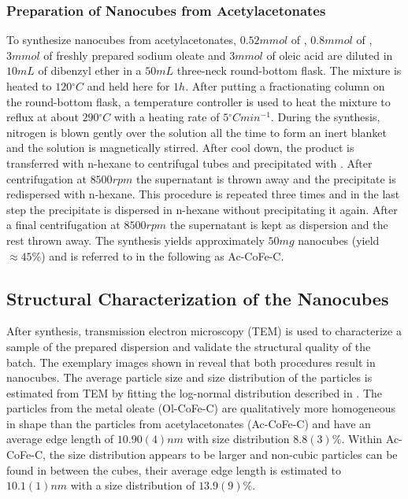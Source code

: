 \documentclass[\main/dresen_thesis.tex]{subfiles}
\begin{document}
    \subsubsection{Preparation of Nanocubes from Acetylacetonates}
      To synthesize nanocubes from acetylacetonates, $0.52 \unit{mmol}$ of , $0.8 \unit{mmol}$ of , $3 \unit{mmol}$ of freshly prepared sodium oleate and $3 \unit{mmol}$ of oleic acid are diluted in $10 \unit{mL}$ of dibenzyl ether in a $50 \unit{mL}$ three-neck round-bottom flask.
      The mixture is heated to $120 \unit{^\circ C}$ and held here for $1 \unit{h}$.
      After putting a fractionating column on the round-bottom flask, a temperature controller is used to heat the mixture to reflux at about $290 \unit{^\circ C}$ with a heating rate of $5 \unit{^\circ C min^{-1}}$.
      During the synthesis, nitrogen is blown gently over the solution all the time to form an inert blanket and the solution is magnetically stirred.
      After cool down, the product is transferred with n-hexane to centrifugal tubes and precipitated with .
      After centrifugation at $8500 \unit{rpm}$ the supernatant is thrown away and the precipitate is redispersed with n-hexane.
      This procedure is repeated three times and in the last step the precipitate is dispersed in n-hexane without precipitating it again.
      After a final centrifugation at $8500 \unit{rpm}$ the supernatant is kept as dispersion and the rest thrown away.
      The synthesis yields approximately $50 \unit{mg}$ nanocubes (yield $\approx 45 \%$) and is referred to in the following as Ac-CoFe-C.

  \subsection{Structural Characterization of the Nanocubes}
  \label{sec:monolayers:nanoparticle:structuralCharacterization}
    After synthesis, transmission electron microscopy (TEM) is used to characterize a sample of the prepared dispersion and validate the structural quality of the batch.
    The exemplary images shown in  reveal that both procedures result in nanocubes.
    The average particle size and size distribution of the particles is estimated from TEM by fitting the log-normal distribution described in .
    The particles from the metal oleate (Ol-CoFe-C) are qualitatively more homogeneous in shape than the particles from acetylacetonates (Ac-CoFe-C) and have an average edge length of $10.90(4) \unit{nm}$ with size distribution $8.8(3) \unit{\%}$.
    Within Ac-CoFe-C, the size distribution appears to be larger and non-cubic particles can be found in between the cubes, their average edge length is estimated to $10.1(1) \unit{nm}$ with a size distribution of $13.9(9) \unit{\%}$.
\end{document}
